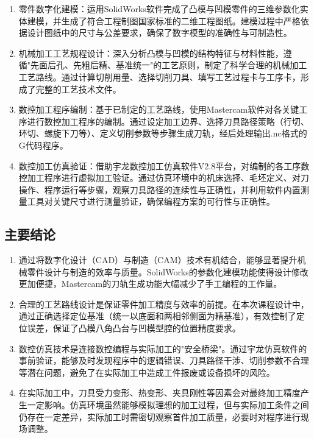 \documentclass{xautCADreport}
\begin{document}
\begin{enumerate}
  \item 零件数字化建模：运用SolidWorks软件完成了凸模与凹模零件的三维参数化实体建模，并生成了符合工程制图国家标准的二维工程图纸。建模过程中严格依据设计图纸中的尺寸与公差要求，确保了数字模型的准确性与可制造性。
  \item 机械加工工艺规程设计：深入分析凸模与凹模的结构特征与材料性能，遵循"先面后孔、先粗后精、基准统一"的工艺原则，制定了科学合理的机械加工工艺路线。通过计算切削用量、选择切削刀具、填写工艺过程卡与工序卡，形成了完整的工艺技术文件。
  \item 数控加工程序编制：基于已制定的工艺路线，使用Mastercam软件对各关键工序进行数控加工程序的编制。通过设定加工边界、选择刀具路径策略（行切、环切、螺旋下刀等）、定义切削参数等步骤生成刀轨，经后处理输出.nc格式的G代码程序。
  \item 数控加工仿真验证：借助宇龙数控加工仿真软件V2.8平台，对编制的各工序数控加工程序进行虚拟加工验证。通过仿真环境中的机床选择、毛坯定义、对刀操作、程序运行等步骤，观察刀具路径的连续性与正确性，并利用软件内置测量工具对关键尺寸进行测量验证，确保编程方案的可行性与正确性。
\end{enumerate}

\subsection{主要结论}

\begin{enumerate}
  \item 通过将数字化设计（CAD）与制造（CAM）技术有机结合，能够显著提升机械零件设计与制造的效率与质量。SolidWorks的参数化建模功能使得设计修改更加便捷，Mastercam的刀轨生成功能大幅减少了手工编程的工作量。
  \item 合理的工艺路线设计是保证零件加工精度与效率的前提。在本次课程设计中，通过正确选择定位基准（统一以底面和两相邻侧面为精基准），有效控制了定位误差，保证了凸模八角凸台与凹模型腔的位置精度要求。
  \item 数控仿真技术是连接数控编程与实际加工的"安全桥梁"。通过宇龙仿真软件的事前验证，能够及时发现程序中的逻辑错误、刀具路径干涉、切削参数不合理等潜在问题，避免了在实际加工中造成工件报废或设备损坏的风险。
  \item 在实际加工中，刀具受力变形、热变形、夹具刚性等因素会对最终加工精度产生一定影响。仿真环境虽然能够模拟理想的加工过程，但与实际加工条件之间仍存在一定差异，实际加工时需密切观察首件加工质量，必要时对程序进行现场调整。
\end{enumerate}
\end{document}
